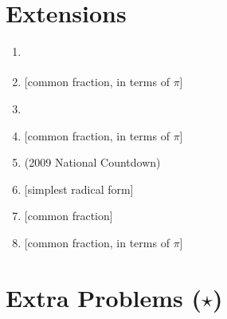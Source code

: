 \documentclass{article}
\begin{document}
\newpage

\section*{Extensions}
\vspace{1cm}
\begin{enumerate}
\item \underline{\hspace{3in}}\vspace{1cm}
\item \underline{\hspace{3in}} [common fraction, in terms of $\pi$]\vspace{1cm}
\item \underline{\hspace{3in}}\vspace{1cm}
\item \underline{\hspace{3in}} [common fraction, in terms of $\pi$]\vspace{1cm}
\item \underline{\hspace{3in}} (2009 National Countdown)\vspace{1cm}
\item \underline{\hspace{3in}} [simplest radical form]\vspace{1cm}
\item \underline{\hspace{3in}} [common fraction]\vspace{1cm}
\item \underline{\hspace{3in}} [common fraction, in terms of $\pi$]
\end{enumerate}


\newpage

\section*{Extra Problems ($\star$)}
\end{document}
